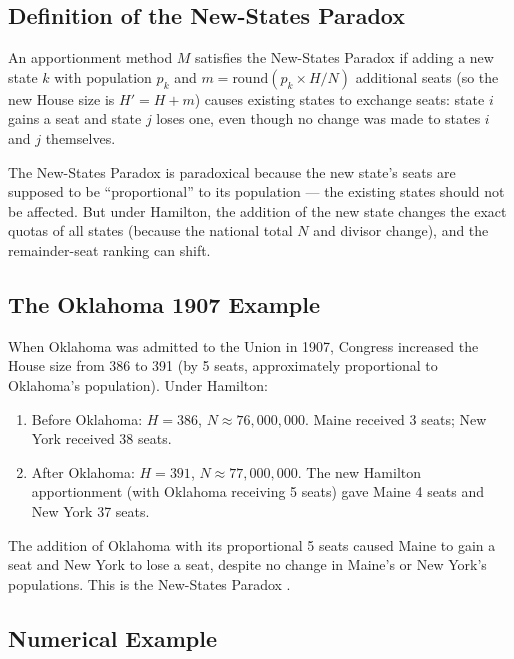 \label{sec:newstates}

\subsection{Definition of the New-States Paradox}

\begin{definition}
  An apportionment method $M$ satisfies the New-States Paradox if
  adding a new state $k$ with population $p_k$ and
  $m = \text{round}(p_k \times H / N)$ additional seats
  (so the new House size is $H' = H + m$) causes existing states
  to exchange seats: state $i$ gains a seat and state $j$ loses one,
  even though no change was made to states $i$ and $j$ themselves.
\end{definition}

The New-States Paradox is paradoxical because the new state's seats are
supposed to be ``proportional'' to its population ---
the existing states should not be affected.
But under Hamilton, the addition of the new state changes the exact quotas
of all states (because the national total $N$ and divisor change),
and the remainder-seat ranking can shift.

\subsection{The Oklahoma 1907 Example}

When Oklahoma was admitted to the Union in 1907, Congress increased
the House size from 386 to 391 (by 5 seats, approximately proportional
to Oklahoma's population).
Under Hamilton:

\begin{enumerate}
  \item Before Oklahoma: $H = 386$, $N \approx 76{,}000{,}000$.
    Maine received 3 seats; New York received 38 seats.
  \item After Oklahoma: $H = 391$, $N \approx 77{,}000{,}000$.
    The new Hamilton apportionment (with Oklahoma receiving 5 seats)
    gave Maine 4 seats and New York 37 seats.
\end{enumerate}

The addition of Oklahoma with its proportional 5 seats caused Maine
to gain a seat and New York to lose a seat, despite no change in
Maine's or New York's populations.
This is the New-States Paradox \citep{balinski1982fair}.

\subsection{Numerical Example}

